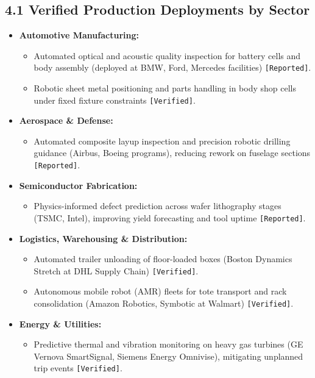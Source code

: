 \documentclass[11pt,a4paper]{article}
\begin{document}
\subsection{4.1 Verified Production Deployments by Sector}
\begin{itemize}
    \item \textbf{Automotive Manufacturing:}
    \begin{itemize}
        \item Automated optical and acoustic quality inspection for battery cells and body assembly (deployed at BMW, Ford, Mercedes facilities) \texttt{[Reported]}.
        \item Robotic sheet metal positioning and parts handling in body shop cells under fixed fixture constraints \texttt{[Verified]}.
    \end{itemize}
    \item \textbf{Aerospace \& Defense:}
    \begin{itemize}
        \item Automated composite layup inspection and precision robotic drilling guidance (Airbus, Boeing programs), reducing rework on fuselage sections \texttt{[Reported]}.
    \end{itemize}
    \item \textbf{Semiconductor Fabrication:}
    \begin{itemize}
        \item Physics-informed defect prediction across wafer lithography stages (TSMC, Intel), improving yield forecasting and tool uptime \texttt{[Reported]}.
    \end{itemize}
    \item \textbf{Logistics, Warehousing \& Distribution:}
    \begin{itemize}
        \item Automated trailer unloading of floor-loaded boxes (Boston Dynamics Stretch at DHL Supply Chain) \texttt{[Verified]}.
        \item Autonomous mobile robot (AMR) fleets for tote transport and rack consolidation (Amazon Robotics, Symbotic at Walmart) \texttt{[Verified]}.
    \end{itemize}
    \item \textbf{Energy \& Utilities:}
    \begin{itemize}
        \item Predictive thermal and vibration monitoring on heavy gas turbines (GE Vernova SmartSignal, Siemens Energy Omnivise), mitigating unplanned trip events \texttt{[Verified]}.
    \end{itemize}
\end{itemize}
\end{document}
